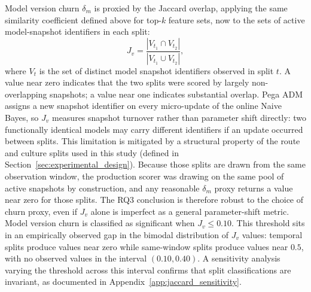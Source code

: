 \documentclass[oneside]{memoir} %
\begin{document}
Model version churn $\delta_m$ is proxied by the Jaccard overlap, applying the same similarity coefficient defined above for top-$k$ feature sets, now to the sets of active model-snapshot identifiers in each split:
\[
J_v = \frac{|V_{t_1} \cap V_{t_2}|}{|V_{t_1} \cup V_{t_2}|},
\]
where $V_t$ is the set of distinct model snapshot identifiers observed in split $t$. A value near zero indicates that the two splits were scored by largely non-overlapping snapshots; a value near one indicates substantial overlap. Pega ADM assigns a new snapshot identifier on every micro-update of the online Naive Bayes, so $J_v$ measures snapshot turnover rather than parameter shift directly: two functionally identical models may carry different identifiers if an update occurred between splits. This limitation is mitigated by a structural property of the route and culture splits used in this study (defined in Section~\ref{sec:experimental_design}). Because those splits are drawn from the same observation window, the production scorer was drawing on the same pool of active snapshots by construction, and any reasonable $\delta_m$ proxy returns a value near zero for those splits. The RQ3 conclusion is therefore robust to the choice of churn proxy, even if $J_v$ alone is imperfect as a general parameter-shift metric. Model version churn is classified as significant when $J_v \leq 0.10$. This threshold sits in an empirically observed gap in the bimodal distribution of $J_v$ values: temporal splits produce values near zero while same-window splits produce values near $0.5$, with no observed values in the interval $(0.10, 0.40)$. A sensitivity analysis varying the threshold across this interval confirms that split classifications are invariant, as documented in Appendix~\ref{app:jaccard_sensitivity}.
\end{document}
